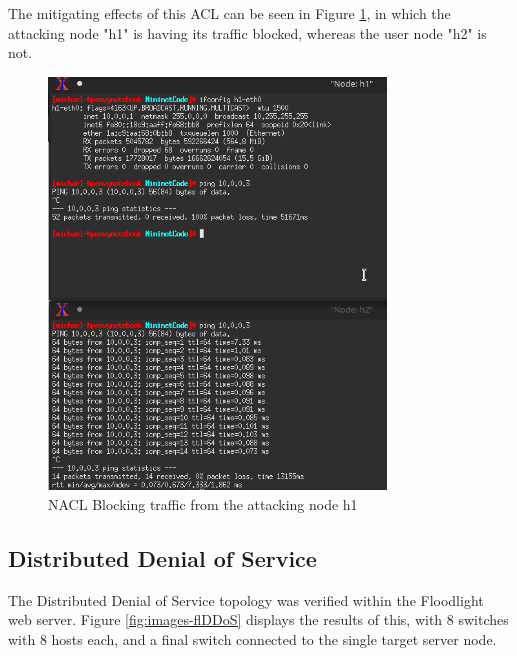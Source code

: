 The mitigating effects of this ACL can be seen in Figure
\ref{fig:images-icmpBlockDos}, in which the attacking node "h1" is having its
traffic blocked, whereas the user node "h2" is not.

\begin{figure}[H]
	\centering
	\includegraphics[width=0.8\textwidth]{images/icmpBlockDos}
	\caption{NACL Blocking traffic from the attacking node h1}
	\label{fig:images-icmpBlockDos}
\end{figure}

\subsection{Distributed Denial of Service}

The Distributed Denial of Service topology was verified within the Floodlight
web server. Figure \ref{fig:images-flDDoS} displays the results of this, with
8 switches with 8 hosts each, and a final switch connected to the single target
server node.

